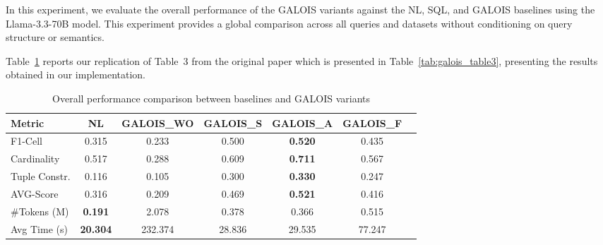 \documentclass[11pt]{article}
\begin{document}
In this experiment, we evaluate the overall performance of the GALOIS variants against the NL, SQL, and GALOIS baselines using the Llama-3.3-70B model.
This experiment provides a global comparison across all queries and datasets without conditioning on query structure or semantics.

Table~\ref{tab:exp1_overall_results} reports our replication of Table~3 from the original paper which is presented in Table~\ref{tab:galois_table3}, presenting the results obtained in our implementation.

\begin{table}[htbp]
\centering
\caption{Overall performance comparison between baselines and GALOIS variants}
\label{tab:exp1_overall_results}
\begin{tabular}{lcccccc}
\hline
Metric 
& NL 
& GALOIS\_WO 
& GALOIS\_S 
& GALOIS\_A 
& GALOIS\_F \\
\hline
F1-Cell       
& 0.315
& 0.233
& 0.500
& \textbf{0.520}
& 0.435 \\

Cardinality   
& 0.517
& 0.288
& 0.609
& \textbf{0.711}
& 0.567 \\

Tuple Constr. 
& 0.116
& 0.105
& 0.300
& \textbf{0.330}
& 0.247 \\

AVG-Score     
& 0.316
& 0.209
& 0.469
& \textbf{0.521}
& 0.416 \\

\#Tokens (M)  
& \textbf{0.191}
& 2.078
& 0.378
& 0.366
& 0.515 \\

Avg Time (s)  
& \textbf{20.304}
& 232.374
& 28.836
& 29.535
& 77.247 \\
\hline
\end{tabular}
\end{table}
\end{document}
